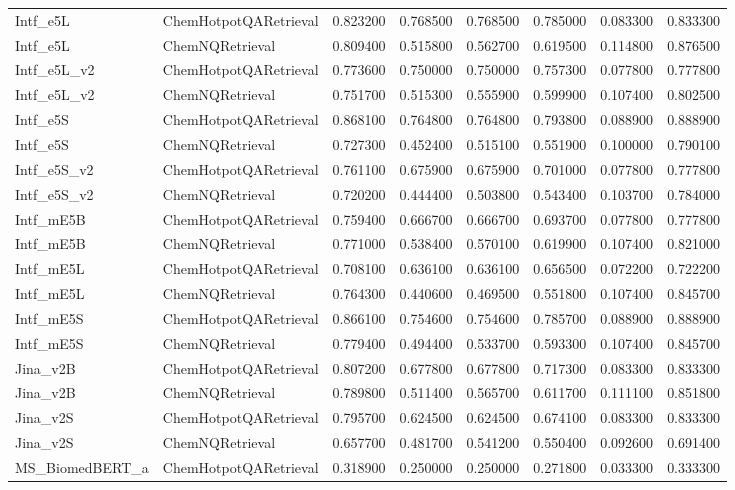 {\begin{longtable}{llrrrrrr}
Intf\_e5L & ChemHotpotQARetrieval & 0.823200 & 0.768500 & 0.768500 & 0.785000 & 0.083300 & 0.833300 \\
Intf\_e5L & ChemNQRetrieval & 0.809400 & 0.515800 & 0.562700 & 0.619500 & 0.114800 & 0.876500 \\
Intf\_e5L\_v2 & ChemHotpotQARetrieval & 0.773600 & 0.750000 & 0.750000 & 0.757300 & 0.077800 & 0.777800 \\
Intf\_e5L\_v2 & ChemNQRetrieval & 0.751700 & 0.515300 & 0.555900 & 0.599900 & 0.107400 & 0.802500 \\
Intf\_e5S & ChemHotpotQARetrieval & 0.868100 & 0.764800 & 0.764800 & 0.793800 & 0.088900 & 0.888900 \\
Intf\_e5S & ChemNQRetrieval & 0.727300 & 0.452400 & 0.515100 & 0.551900 & 0.100000 & 0.790100 \\
Intf\_e5S\_v2 & ChemHotpotQARetrieval & 0.761100 & 0.675900 & 0.675900 & 0.701000 & 0.077800 & 0.777800 \\
Intf\_e5S\_v2 & ChemNQRetrieval & 0.720200 & 0.444400 & 0.503800 & 0.543400 & 0.103700 & 0.784000 \\
Intf\_mE5B & ChemHotpotQARetrieval & 0.759400 & 0.666700 & 0.666700 & 0.693700 & 0.077800 & 0.777800 \\
Intf\_mE5B & ChemNQRetrieval & 0.771000 & 0.538400 & 0.570100 & 0.619900 & 0.107400 & 0.821000 \\
Intf\_mE5L & ChemHotpotQARetrieval & 0.708100 & 0.636100 & 0.636100 & 0.656500 & 0.072200 & 0.722200 \\
Intf\_mE5L & ChemNQRetrieval & 0.764300 & 0.440600 & 0.469500 & 0.551800 & 0.107400 & 0.845700 \\
Intf\_mE5S & ChemHotpotQARetrieval & 0.866100 & 0.754600 & 0.754600 & 0.785700 & 0.088900 & 0.888900 \\
Intf\_mE5S & ChemNQRetrieval & 0.779400 & 0.494400 & 0.533700 & 0.593300 & 0.107400 & 0.845700 \\
Jina\_v2B & ChemHotpotQARetrieval & 0.807200 & 0.677800 & 0.677800 & 0.717300 & 0.083300 & 0.833300 \\
Jina\_v2B & ChemNQRetrieval & 0.789800 & 0.511400 & 0.565700 & 0.611700 & 0.111100 & 0.851800 \\
Jina\_v2S & ChemHotpotQARetrieval & 0.795700 & 0.624500 & 0.624500 & 0.674100 & 0.083300 & 0.833300 \\
Jina\_v2S & ChemNQRetrieval & 0.657700 & 0.481700 & 0.541200 & 0.550400 & 0.092600 & 0.691400 \\
MS\_BiomedBERT\_a & ChemHotpotQARetrieval & 0.318900 & 0.250000 & 0.250000 & 0.271800 & 0.033300 & 0.333300 \\

\end{longtable}}
